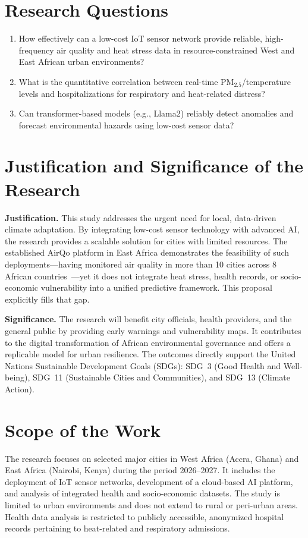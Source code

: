 \documentclass[12pt,a4paper]{report}
\begin{document}
\section{Research Questions}
\begin{enumerate}
  \item How effectively can a low-cost IoT sensor network provide reliable, high-frequency air quality and heat stress data in resource-constrained West and East African urban environments?
  \item What is the quantitative correlation between real-time PM$_{2.5}$/temperature levels and hospitalizations for respiratory and heat-related distress?
  \item Can transformer-based models (e.g., Llama2) reliably detect anomalies and forecast environmental hazards using low-cost sensor data?
\end{enumerate}

\section{Justification and Significance of the Research}
\textbf{Justification.} This study addresses the urgent need for local, data-driven climate adaptation. By integrating low-cost sensor technology with advanced AI, the research provides a scalable solution for cities with limited resources. The established AirQo platform in East Africa demonstrates the feasibility of such deployments—having monitored air quality in more than 10 cities across 8 African countries~\cite{bainomugisha2024}—yet it does not integrate heat stress, health records, or socio-economic vulnerability into a unified predictive framework. This proposal explicitly fills that gap.

\textbf{Significance.} The research will benefit city officials, health providers, and the general public by providing early warnings and vulnerability maps. It contributes to the digital transformation of African environmental governance and offers a replicable model for urban resilience. The outcomes directly support the United Nations Sustainable Development Goals (SDGs): SDG~3 (Good Health and Well-being), SDG~11 (Sustainable Cities and Communities), and SDG~13 (Climate Action).

\section{Scope of the Work}
The research focuses on selected major cities in West Africa (Accra, Ghana) and East Africa (Nairobi, Kenya) during the period 2026--2027. It includes the deployment of IoT sensor networks, development of a cloud-based AI platform, and analysis of integrated health and socio-economic datasets. The study is limited to urban environments and does not extend to rural or peri-urban areas. Health data analysis is restricted to publicly accessible, anonymized hospital records pertaining to heat-related and respiratory admissions.
\end{document}
